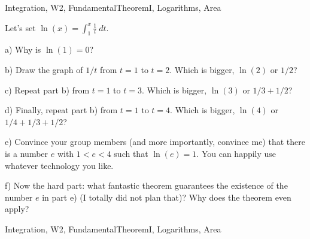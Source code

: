\begin{tagblock}{Integration, W2, FundamentalTheoremI, Logarithms, Area}
\begin{question}
	Let's set $\ln(x)=\displaystyle\int_1^x\frac 1 t \ dt$. 

\bigskip

a) Why is $\ln(1)=0$?

\bigskip


b) Draw the graph of $1/t$ from $t=1$ to $t=2$. Which is bigger, $\ln(2)$ or $1/2$?

\bigskip

c) Repeat part b) from $t=1$ to $t=3$. Which is bigger, $\ln(3)$ or $1/3+1/2$?

\bigskip

d) Finally, repeat part b) from $t=1$ to $t=4$. Which is bigger, $\ln(4)$ or $1/4+1/3+1/2$?

\bigskip

e) Convince your group members (and more importantly, convince me) that there is a number $e$ with $1<e<4$ such that $\ln(e)=1$. You can happily use whatever technology you like.

\bigskip

f) Now the hard part: what fantastic theorem guarantees the existence of the number $e$ in part e) (I totally did not plan that)? Why does the theorem even apply?
	
	
\begin{tags}
	    Integration, W2, FundamentalTheoremI, Logarithms, Area
\end{tags}
	
\begin{diary}
	   
\end{diary}
	
\begin{solution}
	   
	    \end{enumerate}
\end{solution}
	
\end{question}

\end{tagblock}


